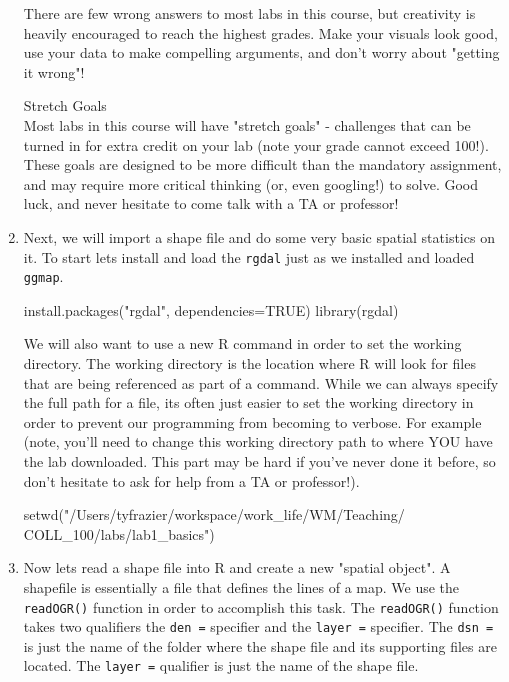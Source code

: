 \documentclass{article}
\newenvironment{Schunk}{}{}
\newcommand{\code}[1]{\texttt{#1}}
\newcommand{\pkg}[1]{\mbox{\texttt{#1}}}
\newcommand{\proglang}[1]{\textsf{#1}}
\begin{document}
\begin{enumerate}[leftmargin=15mm]
\begin{itemize}
\end{itemize}

There are few wrong answers to most labs in this course, but creativity is heavily encouraged to reach the highest grades.  Make your visuals look good, use your data to make compelling arguments, and don't worry about "getting it wrong"!  



\newpage 
{\huge Stretch Goals}\\
Most labs in this course will have "stretch goals" - challenges that can be turned in for extra credit on your lab (note your grade cannot exceed 100!).  These goals are designed to be more difficult than the mandatory assignment, and may require more critical thinking (or, even googling!) to solve.  Good luck, and never hesitate to come talk with a TA or professor!


\item Next, we will import a shape file and do some very basic spatial statistics on it.  To start lets install and load the \pkg{rgdal} just as we installed and loaded \pkg{ggmap}.

\begin{Schunk}
\begin{Sinput}
install.packages("rgdal", dependencies=TRUE)
library(rgdal)
\end{Sinput}
\end{Schunk}

We will also want to use a new \proglang{R} command in order to set the working directory.  The working directory is the location where \proglang{R} will look for files that are being referenced as part of a command.  While we can always specify the full path for a file, its often just easier to set the working directory in order to prevent our programming from becoming to verbose.  For example (note, you'll need to change this working directory path to where YOU have the lab downloaded.  This part may be hard if you've never done it before, so don't hesitate to ask for help from a TA or professor!).

\begin{Schunk}
\begin{Sinput}
setwd("/Users/tyfrazier/workspace/work_life/WM/Teaching/
COLL_100/labs/lab1_basics")
\end{Sinput}
\end{Schunk}

\item Now lets read a shape file into \proglang{R} and create a new "spatial object".  A shapefile is essentially a file that defines the lines of a map.  We use the \code{readOGR()} function in order to accomplish this task.  The \code{readOGR()} function takes two qualifiers the \code{den =} specifier and the \code{layer =} specifier.  The \code{dsn = } is just the name of the folder where the shape file and its supporting files are located.  The \code{layer =} qualifier is just the name of the shape file. 


\end{enumerate}
\end{document}
